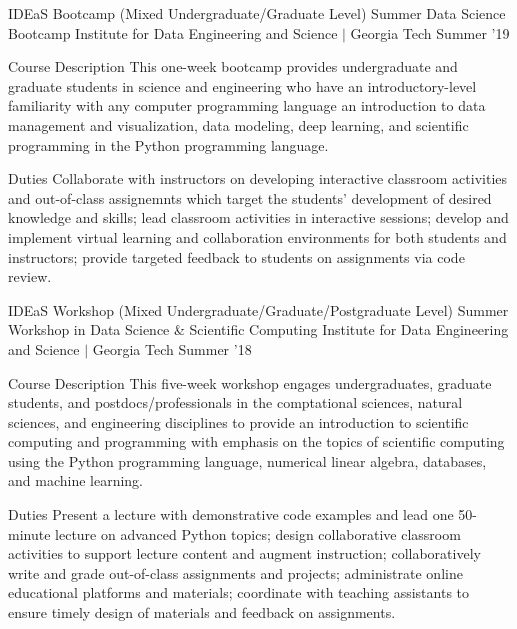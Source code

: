 \begin{cventries}

  \cvteachingentry
    {IDEaS Bootcamp (Mixed Undergraduate/Graduate Level)} %
    {Summer Data Science Bootcamp} %
    {Institute for Data Engineering and Science $\vert$ Georgia Tech} %
    {Summer '19} %
    {%
    \begin{cvdescription}
    \item[Course Description] This one-week bootcamp provides undergraduate and graduate
        students in science and engineering who have an introductory-level familiarity 
        with any computer programming language an introduction to data management and 
        visualization, data modeling, deep learning, and scientific programming in the
        Python programming language.
    \item[Duties] Collaborate with instructors on developing
        interactive classroom activities and out-of-class assignemnts which target the
        students' development of desired knowledge and skills; lead classroom
        activities in interactive sessions; develop and implement virtual learning and
        collaboration environments for both students and instructors; provide targeted
        feedback to students on assignments via code review.
    \end{cvdescription}
    }

  \cvteachingentry
    {IDEaS Workshop (Mixed Undergraduate/Graduate/Postgraduate Level)} %
    {Summer Workshop in Data Science \& Scientific Computing} %
    {Institute for Data Engineering and Science $\vert$ Georgia Tech} %
    {Summer '18} %
    {%
    \begin{cvdescription}
    \item[Course Description] This five-week workshop engages undergraduates,
        graduate students, and postdocs/professionals in the comptational sciences,
        natural sciences, and engineering disciplines to provide an introduction to
        scientific computing and programming with emphasis on the topics of scientific
        computing using the Python programming language, numerical linear algebra,
        databases, and machine learning.
    \item[Duties] Present a lecture with demonstrative code examples and
        lead one 50-minute lecture on advanced Python topics; design collaborative 
        classroom activities to support lecture content and augment instruction; 
        collaboratively write and grade out-of-class assignments and projects; 
        administrate online educational platforms and materials; coordinate with 
        teaching assistants to ensure timely design of materials and feedback on 
        assignments.
    \end{cvdescription}
    }


\end{cventries}
